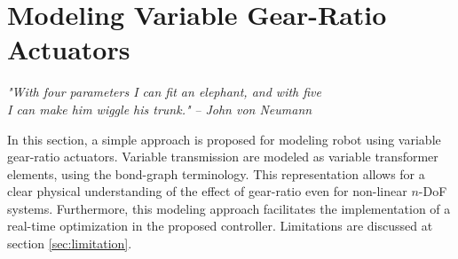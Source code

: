 



\newpage

\section{Modeling Variable Gear-Ratio Actuators}
\label{sec:model}

\begin{flushright}
{%
\textit{"With four parameters I can fit an elephant, and with five \\ I can make him wiggle his trunk."}
 }
 \emph{-- John von Neumann}
\end{flushright}
\vspace{+10pt}

In this section, a simple approach is proposed for modeling robot using variable gear-ratio actuators. Variable transmission are modeled as variable transformer elements, using the bond-graph terminology. This representation allows for a clear physical understanding of the effect of gear-ratio even for non-linear $n$-DoF systems. Furthermore, this modeling approach facilitates the implementation of a real-time optimization in the proposed controller. Limitations are discussed at section \ref{sec:limitation}.

